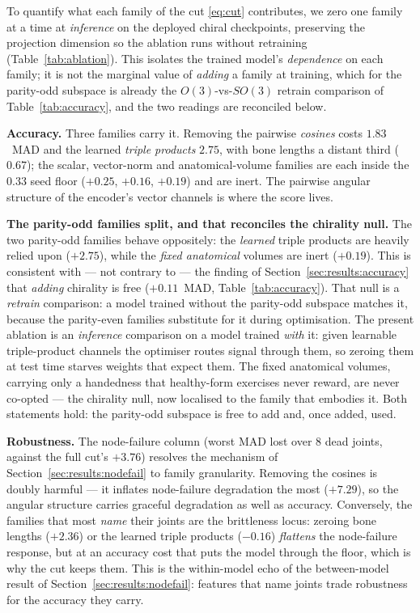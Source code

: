 To quantify what each family of the cut \eqref{eq:cut} contributes, we zero one family at a time at
\emph{inference} on the deployed chiral checkpoints, preserving the projection dimension so the
ablation runs without retraining (Table~\ref{tab:ablation}). This isolates the trained model's
\emph{dependence} on each family; it is not the marginal value of \emph{adding} a family at training,
which for the parity-odd subspace is already the $O(3)$-vs-$SO(3)$ retrain comparison of
Table~\ref{tab:accuracy}, and the two readings are reconciled below.

\textbf{Accuracy.} Three families carry it. Removing the pairwise \emph{cosines} costs $1.83$~MAD and
the learned \emph{triple products} $2.75$, with bone lengths a distant third ($0.67$); the scalar,
vector-norm and anatomical-volume families are each inside the $0.33$ seed floor ($+0.25$, $+0.16$,
$+0.19$) and are inert. The pairwise angular structure of the encoder's vector channels is where the
score lives.

\textbf{The parity-odd families split, and that reconciles the chirality null.} The two parity-odd
families behave oppositely: the \emph{learned} triple products are heavily relied upon ($+2.75$),
while the \emph{fixed anatomical} volumes are inert ($+0.19$). This is consistent with --- not
contrary to --- the finding of Section~\ref{sec:results:accuracy} that \emph{adding} chirality is
free ($+0.11$~MAD, Table~\ref{tab:accuracy}). That null is a \emph{retrain} comparison: a model
trained without the parity-odd subspace matches it, because the parity-even families substitute for it
during optimisation. The present ablation is an \emph{inference} comparison on a model trained
\emph{with} it: given learnable triple-product channels the optimiser routes signal through them, so
zeroing them at test time starves weights that expect them. The fixed anatomical volumes, carrying
only a handedness that healthy-form exercises never reward, are never co-opted --- the chirality null,
now localised to the family that embodies it. Both statements hold: the parity-odd subspace is free to
add and, once added, used.

\textbf{Robustness.} The node-failure column (worst MAD lost over $8$ dead joints, against the full
cut's $+3.76$) resolves the mechanism of Section~\ref{sec:results:nodefail} to family granularity.
Removing the cosines is doubly harmful --- it inflates node-failure degradation the most ($+7.29$), so
the angular structure carries graceful degradation as well as accuracy. Conversely, the families that
most \emph{name} their joints are the brittleness locus: zeroing bone lengths ($+2.36$) or the learned
triple products ($-0.16$) \emph{flattens} the node-failure response, but at an accuracy cost that puts
the model through the floor, which is why the cut keeps them. This is the within-model echo of the
between-model result of Section~\ref{sec:results:nodefail}: features that name joints trade robustness
for the accuracy they carry.

